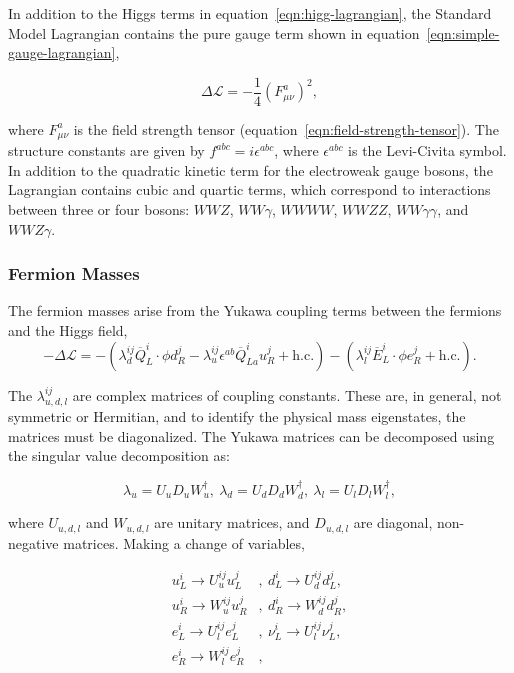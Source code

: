 In addition to the Higgs terms in equation~\ref{eqn:higg-lagrangian}, the Standard Model Lagrangian contains the pure gauge term shown in equation~\ref{eqn:simple-gauge-lagrangian}, 

\begin{equation}
	\Delta\mathcal{L} = -\frac14(F^a_{\mu\nu})^2,
\end{equation}

where $F_{\mu\nu}^a$ is the field strength tensor (equation~\ref{eqn:field-strength-tensor}). The structure constants are given by $f^{abc}=i\epsilon^{abc}$, where $\epsilon^{abc}$ is the Levi-Civita symbol. In addition to the quadratic kinetic term for the electroweak gauge bosons, the Lagrangian contains cubic and quartic terms, which correspond to interactions between three or four bosons: $WWZ$, $WW\gamma$, $WWWW$, $WWZZ$, $WW\gamma\gamma$, and $WWZ\gamma$. 


\subsubsection{Fermion Masses}\label{sec:standard-model-fermion-masses}
The fermion masses arise from the Yukawa coupling terms between the fermions and the Higgs field,
\begin{equation}\label{eqn:lagrangian-yukawa-couplings}
	-\Delta \mathcal{L} = - \left(\lambda_d^{ij} \overline{Q}_L^i \cdot \phi d_R^j - \lambda_u^{ij} \epsilon^{ab}\overline{Q}^i_{La} u_R^j + \mathrm{h.c.}\right) - \left(\lambda_l^{ij} \overline{E}^i_L \cdot \phi e_R^j + \mathrm{h.c.}\right).
\end{equation}
 
 The $\lambda_{u,d,l}^{ij}$ are complex matrices of coupling constants. These are, in general, not symmetric or Hermitian, and to identify the physical mass eigenstates, the matrices must be diagonalized. The Yukawa matrices can be decomposed using the singular value decomposition as:

\begin{equation}
	\lambda_u = U_u D_u W_u^{\dagger},\ \lambda_d = U_d D_d W_d^{\dagger},\ \lambda_l = U_l D_l W_l^{\dagger},
\end{equation}
 
where $U_{u,d,l}$ and $W_{u,d,l}$ are unitary matrices, and $D_{u,d,l}$ are diagonal, non-negative matrices. Making a change of variables,

\begin{align}\label{eqn:yukawa-diagonalization}
	u_L^i\rightarrow U_{u}^{ij}u_L^j&,\ d_L^i\rightarrow U_d^{ij}d_L^j, \\
	u_R^i\rightarrow W_{u}^{ij}u_R^j&,\ d_R^i\rightarrow W_d^{ij}d_R^j, \\
	e_L^i\rightarrow U_l^{ij}e_L^j&,\ \nu_L^i\rightarrow U_l^{ij}\nu_L^j, \\
	e_R^i\rightarrow W_l^{ij}e_R^j&,
\end{align}

